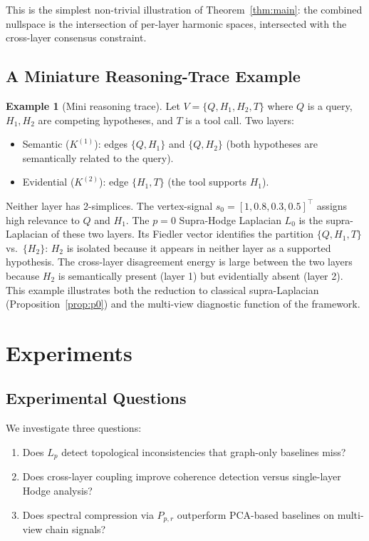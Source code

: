 \documentclass[11pt]{article}
\theoremstyle{definition}
\newtheorem{example}[theorem]{Example}
\theoremstyle{remark}
\newcommand{\Pp}{P_{p,r}}
\begin{document}
This is the simplest non-trivial illustration of Theorem~\ref{thm:main}: the
combined nullspace is the intersection of per-layer harmonic spaces, intersected
with the cross-layer consensus constraint.

\subsection{A Miniature Reasoning-Trace Example}

\begin{example}[Mini reasoning trace]
\label{ex:reasoning}
Let $V=\{Q, H_1, H_2, T\}$ where $Q$ is a query, $H_1, H_2$ are competing
hypotheses, and $T$ is a tool call. Two layers:
\begin{itemize}
\item Semantic ($K^{(1)}$): edges $\{Q,H_1\}$ and $\{Q,H_2\}$ (both hypotheses
      are semantically related to the query).
\item Evidential ($K^{(2)}$): edge $\{H_1,T\}$ (the tool supports $H_1$).
\end{itemize}
Neither layer has 2-simplices. The vertex-signal $s_0=[1, 0.8, 0.3, 0.5]^\top$
assigns high relevance to $Q$ and $H_1$. The $p=0$ Supra-Hodge Laplacian $L_0$
is the supra-Laplacian of these two layers. Its Fiedler vector identifies the
partition $\{Q, H_1, T\}$ vs.\ $\{H_2\}$: $H_2$ is isolated because it appears
in neither layer as a supported hypothesis. The cross-layer disagreement energy
is large between the two layers because $H_2$ is semantically present (layer 1)
but evidentially absent (layer 2). This example illustrates both the reduction
to classical supra-Laplacian (Proposition~\ref{prop:p0}) and the multi-view
diagnostic function of the framework.
\end{example}


\section{Experiments}
\label{sec:experiments}

\subsection{Experimental Questions}

We investigate three questions:
\begin{enumerate}
\item Does $L_p$ detect topological inconsistencies that graph-only baselines
      miss?
\item Does cross-layer coupling improve coherence detection versus single-layer
      Hodge analysis?
\item Does spectral compression via $\Pp$ outperform PCA-based baselines on
      multi-view chain signals?
\end{enumerate}
\end{document}
